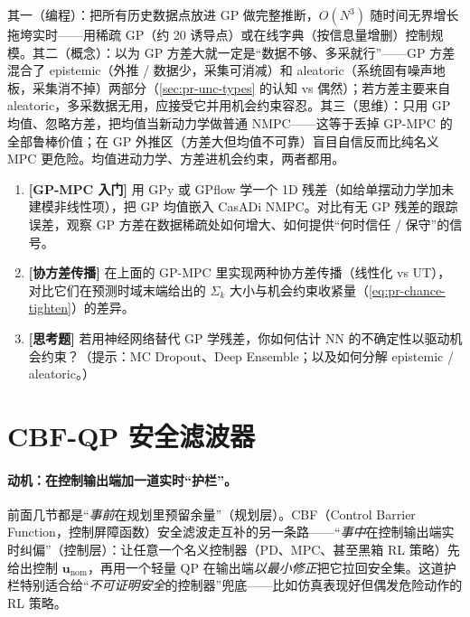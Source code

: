 \begin{pitfall}
其一（编程）：把所有历史数据点放进 GP 做完整推断，$O(N^3)$ 随时间无界增长拖垮实时——用稀疏 GP（约 20 诱导点）或在线字典（按信息量增删）控制规模。其二（概念）：以为 GP 方差大就一定是“数据不够、多采就行”——GP 方差混合了 epistemic（外推 / 数据少，采集可消减）和 aleatoric（系统固有噪声地板，采集消不掉）两部分（\cref{sec:pr-unc-types} 的认知 vs 偶然）；若方差主要来自 aleatoric，多采数据无用，应接受它并用机会约束容忍。其三（思维）：只用 GP 均值、忽略方差，把均值当新动力学做普通 NMPC——这等于丢掉 GP-MPC 的全部鲁棒价值；在 GP 外推区（方差大但均值不可靠）盲目自信反而比纯名义 MPC 更危险。均值进动力学、方差进机会约束，两者都用。
\end{pitfall}

\begin{practice}
\begin{enumerate}
  \item \textbf{[GP-MPC 入门]} 用 GPy 或 GPflow 学一个 1D 残差（如给单摆动力学加未建模非线性项），把 GP 均值嵌入 CasADi NMPC。对比有无 GP 残差的跟踪误差，观察 GP 方差在数据稀疏处如何增大、如何提供“何时信任 / 保守”的信号。
  \item \textbf{[协方差传播]} 在上面的 GP-MPC 里实现两种协方差传播（线性化 vs UT），对比它们在预测时域末端给出的 $\Sigma_k$ 大小与机会约束收紧量（\cref{eq:pr-chance-tighten}）的差异。
  \item \textbf{[思考题]} 若用神经网络替代 GP 学残差，你如何估计 NN 的不确定性以驱动机会约束？（提示：MC Dropout、Deep Ensemble；以及如何分解 epistemic / aleatoric。）
\end{enumerate}
\end{practice}

\section{CBF-QP 安全滤波器}
\label{sec:pr-cbf}

\paragraph{动机：在控制输出端加一道实时“护栏”。}
前面几节都是“\emph{事前}在规划里预留余量”（规划层）。CBF（Control Barrier Function，控制屏障函数）安全滤波走互补的另一条路——“\emph{事中}在控制输出端实时纠偏”（控制层）：让任意一个名义控制器（PD、MPC、甚至黑箱 RL 策略）先给出控制 $\mathbf{u}_{\mathrm{nom}}$，再用一个轻量 QP 在输出端\emph{以最小修正}把它拉回安全集。这道护栏特别适合给“\emph{不可证明安全}的控制器”兜底——比如仿真表现好但偶发危险动作的 RL 策略。

